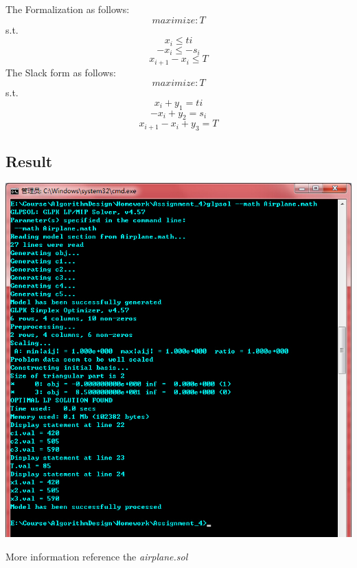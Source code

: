 \documentclass{article}
\numberwithin{equation}{section}
\begin{document}
The Formalization as follows:
        \begin{equation}
             maximize:  T
        \end{equation}
        s.t.
        \begin{equation}
             x_i  \leq ti
        \end{equation}
        \begin{equation}
             -x_i \leq -s_i
        \end{equation}
        \begin{equation}
             x_{i+1} - x_i \leq T
        \end{equation}
The Slack form as follows:
        \begin{equation}
             maximize: T
        \end{equation}
        s.t.
        \begin{equation}
         x_i  + y_1 =  ti
        \end{equation}
        \begin{equation}
             -x_i + y_2 =  s_i
        \end{equation}
        \begin{equation}
             x_{i+1} - x_i + y_3 = T
        \end{equation}
\subsection{Result}
        \begin{center}
            \includegraphics[width=0.75\columnwidth]{airplantresult} %
        \end{center}
        More information reference the \emph{airplane.sol}
%
%
\end{document}
